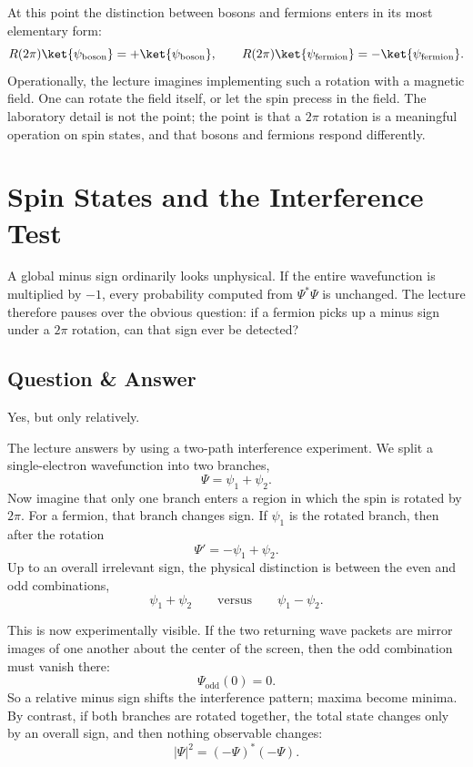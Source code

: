 At this point the distinction between bosons and fermions enters in its most elementary form:
\begin{equation}
R(2\pi)\ket{\psi_{\mathrm{boson}}}=+\ket{\psi_{\mathrm{boson}}},
\qquad
R(2\pi)\ket{\psi_{\mathrm{fermion}}}=-\ket{\psi_{\mathrm{fermion}}}.
\end{equation}
Operationally, the lecture imagines implementing such a rotation with a magnetic field. One can rotate the field itself, or let the spin precess in the field. The laboratory detail is not the point; the point is that a \(2\pi\) rotation is a meaningful operation on spin states, and that bosons and fermions respond differently.

\section{Spin States and the Interference Test}

A global minus sign ordinarily looks unphysical. If the entire wavefunction is multiplied by \(-1\), every probability computed from \(\Psi^*\Psi\) is unchanged. The lecture therefore pauses over the obvious question: if a fermion picks up a minus sign under a \(2\pi\) rotation, can that sign ever be detected?

\subsection{Question \& Answer}

Yes, but only relatively.

The lecture answers by using a two-path interference experiment. We split a single-electron wavefunction into two branches,
\begin{equation}
\Psi=\psi_1+\psi_2.
\end{equation}
Now imagine that only one branch enters a region in which the spin is rotated by \(2\pi\). For a fermion, that branch changes sign. If \(\psi_1\) is the rotated branch, then after the rotation
\begin{equation}
\Psi'=-\psi_1+\psi_2.
\end{equation}
Up to an overall irrelevant sign, the physical distinction is between the even and odd combinations,
\begin{equation}
\psi_1+\psi_2
\qquad \text{versus} \qquad
\psi_1-\psi_2.
\end{equation}

This is now experimentally visible. If the two returning wave packets are mirror images of one another about the center of the screen, then the odd combination must vanish there:
\begin{equation}
\Psi_{\mathrm{odd}}(0)=0.
\end{equation}
So a relative minus sign shifts the interference pattern; maxima become minima. By contrast, if both branches are rotated together, the total state changes only by an overall sign, and then nothing observable changes:
\begin{equation}
|\Psi|^2 = (-\Psi)^*(-\Psi).
\end{equation}

